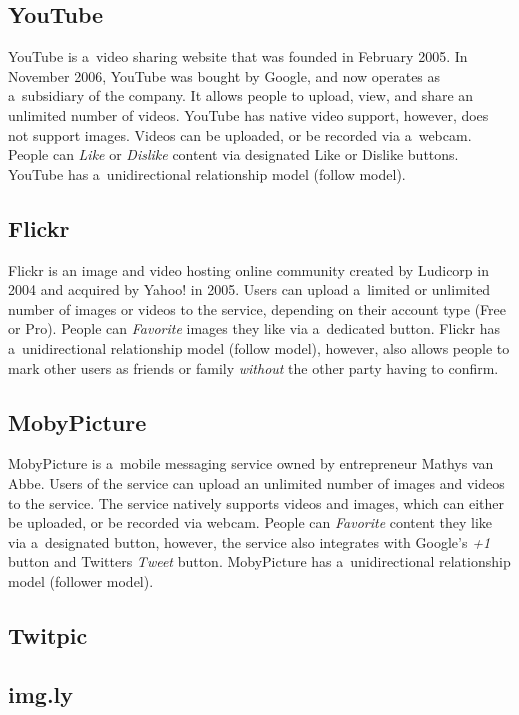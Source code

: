 \subsection{YouTube}
YouTube is a~video sharing website that was founded in February 2005.
In November 2006, YouTube was bought by Google,
and now operates as a~subsidiary of the company.
It allows people to upload, view, and share an unlimited number of videos.
YouTube has native video support, however, does not support images.
Videos can be uploaded, or be recorded via a~webcam.
People can \emph{Like} or \emph{Dislike} content via designated Like or Dislike buttons.
YouTube has a~unidirectional relationship model (follow model).

\subsection{Flickr}
Flickr is an image and video hosting online community created by Ludicorp in 2004
and acquired by Yahoo! in 2005.
Users can upload a~limited or unlimited number of images or videos to the service,
depending on their account type (Free or Pro). 
People can \emph{Favorite} images they like via a~dedicated button.
Flickr has a~unidirectional relationship model (follow model), however,
also allows people to mark other users as friends or family \emph{without}
the other party having to confirm.

\subsection{MobyPicture}
MobyPicture is a~mobile messaging service owned by entrepreneur Mathys van Abbe.
Users of the service can upload an unlimited number of images and videos to the service.
The service natively supports videos and images,
which can either be uploaded, or be recorded via webcam.
People can \emph{Favorite} content they like via a~designated button,
however, the service also integrates with Google's \emph{+1} button and
Twitters \emph{Tweet} button. 
MobyPicture has a~unidirectional relationship model (follower model).

\subsection{Twitpic}


\subsection{img.ly}

